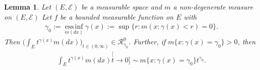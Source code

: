 \documentclass[12pt,a4paper]{amsart}
\newtheorem{lem}[thm]{Lemma}
\theoremstyle{definition}
\numberwithin{equation}{section}
\begin{document}
\begin{lem}\label{lem:regularly_variation_and_integration}
Let $(E, \mathscr E)$ be a measurable space and $m$ a  non-degenerate measure
on $(E, \mathscr E)$
Let $f$ be a bounded measurable function on $E$ with 
  \begin{align}
    \gamma_0
    := \operatorname*{ess\,inf}_{m(dx)} \gamma(x)
    := \sup\{r:m(x:\gamma(x) < r) = 0\}.
  \end{align}
	Then $\big(\int_E t^{\gamma(x)} m(dx)\big)_{t\in (0,\infty)} \in \mathcal R^0_{\gamma_0}$.
	Further, if $m\{x:\gamma(x) = \gamma_0\}>0$, then
\begin{align}
	\int_E t^{\gamma(x)} m(dx)
	\stackrel[t\to 0]{}{\sim}  m\{x:\gamma(x) = \gamma_0\} t^{\gamma_0}.
\end{align}
\end{lem}
\end{document}
